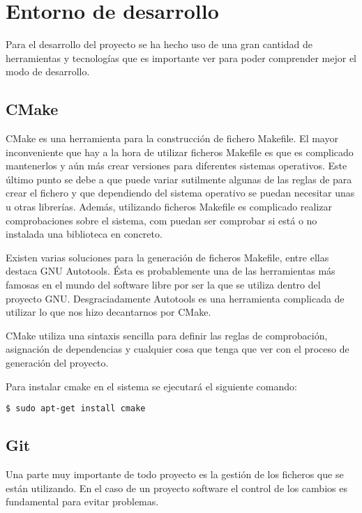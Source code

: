 \chapter{Entorno de desarrollo}

Para el desarrollo del proyecto se ha hecho uso de una gran cantidad de herramientas y tecnologías que es importante ver para poder comprender mejor el modo de desarrollo.

\section{CMake}

CMake es una herramienta para la construcción de fichero Makefile. El mayor inconveniente que hay a la hora de utilizar ficheros Makefile es que es complicado mantenerlos y aún más crear versiones para diferentes sistemas operativos. Este último punto se debe a que puede variar sutilmente algunas de las reglas de para crear el fichero y que dependiendo del sistema operativo se puedan necesitar unas u otras librerías. Además, utilizando ficheros Makefile es complicado realizar comprobaciones sobre el sistema, com puedan ser comprobar si está o no instalada una biblioteca en concreto.

Existen varias soluciones para la generación de ficheros Makefile, entre ellas destaca GNU Autotools. Ésta es probablemente una de las herramientas más famosas en el mundo del software libre por ser la que se utiliza dentro del proyecto GNU. Desgraciadamente Autotools es una herramienta complicada de utilizar lo que nos hizo decantarnos por CMake.

CMake utiliza una sintaxis sencilla para definir las reglas de comprobación, asignación de dependencias y cualquier cosa que tenga que ver con el proceso de generación del proyecto.

Para instalar cmake en el sistema se ejecutará el siguiente comando:

\begin{verbatim}
$ sudo apt-get install cmake
\end{verbatim}

\section{Git}

Una parte muy importante de todo proyecto es la gestión de los ficheros que se están utilizando. En el caso de un proyecto software el control de los cambios es fundamental para evitar problemas.


